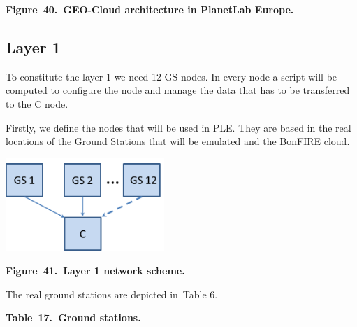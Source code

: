 \documentclass[a4paper]{article}
\begin{document}
{\centering\bfseries
Figure\ 40.\ GEO-Cloud architecture in PlanetLab Europe.
\par}


\bigskip


\bigskip

\subsection[Layer 1]{Layer 1}
\hypertarget{Toc381777244}{}
\bigskip

To constitute the layer 1 we need 12 GS nodes. In every node a script
will be computed to configure the node and manage the data that has to
be transferred to the C node.


\bigskip

Firstly, we define the nodes that will be used in PLE. They are based in
the real locations of the Ground Stations that will be emulated and the
BonFIRE cloud.


\bigskip


\bigskip

{\centering 
\includegraphics[width=2.36591in,height=1.38071in]{out-img49.png} \par}

{\centering\bfseries
Figure\ 41.\ Layer 1 network scheme.
\par}


\bigskip


\bigskip


\bigskip


\bigskip

The real ground stations are depicted in\ Table 6.


\bigskip


\bigskip

{\centering\bfseries
Table\ 17.\ Ground stations.
\par}
\end{document}
